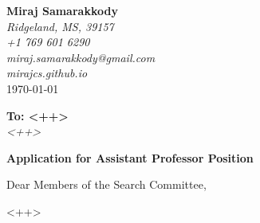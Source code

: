 \documentclass[letterpaper,12pt]{letter}
\begin{document}
\begin{letter}{}

\raggedleft

\textbf{Miraj Samarakkody} \\
\textit{Ridgeland, MS, 39157} \\
\faPhone{} \textit{+1 769 601 6290} \\
\faEnvelope{} \textit{miraj.samarakkody@gmail.com} \\
\faGlobe{}\textit{mirajcs.github.io}\\
\today

\bigskip

\raggedright

\textbf{To: <++>} \\

\textit{<++>} \\



\bigskip
\justify


\textbf{Application for Assistant Professor Position}

Dear Members of the Search Committee,

<++>




\end{letter}
\end{document}
